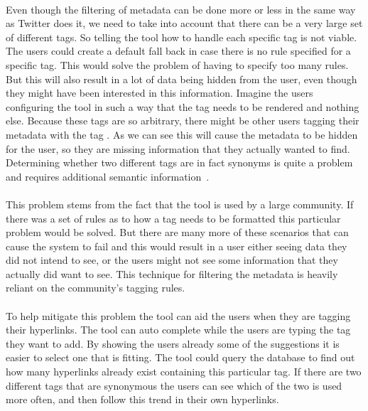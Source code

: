 		\paragraph{}
		Even though the filtering of metadata can be done more or less in the same way as Twitter does it, we need to take into account that there can be a very large set of different tags. So telling the tool how to handle each specific tag is not viable. The users could create a default fall back in case there is no rule specified for a specific tag. This would solve the problem of having to specify too many rules. But this will also result in a lot of data being hidden from the user, even though they might have been interested in this information. Imagine the users configuring the tool in such a way that the tag  needs to be rendered and nothing else. Because these tags are so arbitrary, there might be other users tagging their metadata with the tag . As we can see this will cause the metadata to be hidden for the user, so they are missing information that they actually wanted to find. Determining whether two different tags are in fact synonyms is quite a problem and requires additional semantic information~\cite{marchetti2007semkey}.
		\paragraph{}
		This problem stems from the fact that the tool is used by a large community. If there was a set of rules as to how a tag needs to be formatted this particular problem would be solved. But there are many more of these scenarios that can cause the system to fail and this would result in a user either seeing data they did not intend to see, or the users might not see some information that they actually did want to see. This technique for filtering the metadata is heavily reliant on the community's tagging rules.
		\paragraph{}
		To help mitigate this problem the tool can aid the users when they are tagging their hyperlinks. The tool can auto complete while the users are typing the tag they want to add. By showing the users already some of the suggestions it is easier to select one that is fitting. The tool could query the database to find out how many hyperlinks already exist containing this particular tag. If there are two different tags that are synonymous the users can see which of the two is used more often, and then follow this trend in their own hyperlinks.
